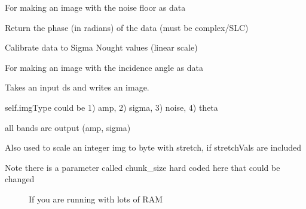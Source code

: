 \documentclass[letterpaper,10pt,english]{sphinxmanual}
\begin{document}
\begin{fulllineitems}
\begin{fulllineitems}
\end{fulllineitems}


\begin{fulllineitems}
\label{code:Image.Image.getNoise}
For making an image with the noise floor as data

\end{fulllineitems}


\begin{fulllineitems}
\label{code:Image.Image.getPhase}
Return the phase (in radians) of the data (must be complex/SLC)

\end{fulllineitems}


\begin{fulllineitems}
\label{code:Image.Image.getSigma}
Calibrate data to Sigma Nought values (linear scale)

\end{fulllineitems}


\begin{fulllineitems}
\label{code:Image.Image.getTheta}
For making an image with the incidence angle as data

\end{fulllineitems}


\begin{fulllineitems}
\label{code:Image.Image.imgWrite}
Takes an input ds and writes an image.

self.imgType could be 1) amp, 2) sigma, 3) noise, 4) theta

all bands are output (amp, sigma)

Also used to scale an integer img to byte with stretch, if stretchVals are included
\begin{description}
\item[{Note there is a parameter called chunk\_size hard coded here that could be changed }] \leavevmode
If you are running with lots of RAM


\end{description}
\end{fulllineitems}
\end{fulllineitems}
\end{document}
